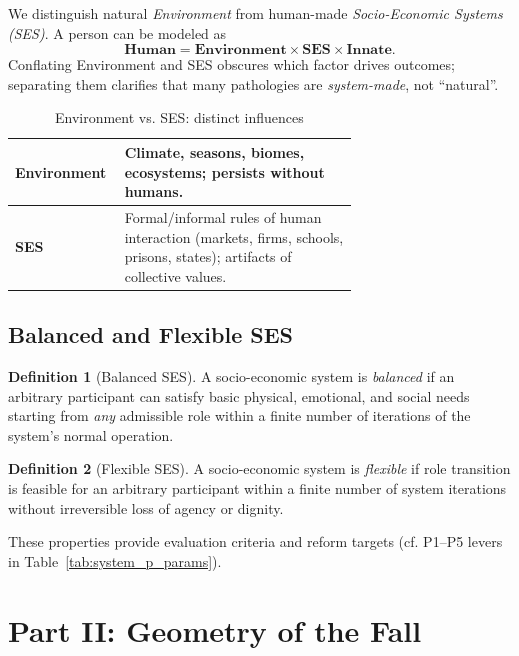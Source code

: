 \documentclass[11pt,a4paper]{article}
\theoremstyle{definition}
\newtheorem{definition}{Definition}[section]
\theoremstyle{remark}
\begin{document}
We distinguish natural \emph{Environment} from human-made \emph{Socio-Economic Systems (SES)}. A person can be modeled as
\[
\textbf{Human} = \textbf{Environment} \times \textbf{SES} \times \textbf{Innate}.
\]
Conflating Environment and SES obscures which factor drives outcomes; separating them clarifies that many pathologies are \emph{system-made}, not “natural”. %

\begin{table}[h]
\centering
\caption{Environment vs. SES: distinct influences}
\label{tab:env_ses_split}
\begin{tabular}{|l|p{0.68\linewidth}|}
\hline
\textbf{Environment} & Climate, seasons, biomes, ecosystems; persists without humans. \\
\hline
\textbf{SES} & Formal/informal rules of human interaction (markets, firms, schools, prisons, states); artifacts of collective values. \\
\hline
\end{tabular}
\end{table}

\subsection{Balanced and Flexible SES}
\label{subsec:balanced_flexible_ses}

\begin{definition}[Balanced SES]
A socio-economic system is \emph{balanced} if an arbitrary participant can satisfy basic physical, emotional, and social needs starting from \emph{any} admissible role within a finite number of iterations of the system's normal operation. %
\end{definition}

\begin{definition}[Flexible SES]
A socio-economic system is \emph{flexible} if role transition is feasible for an arbitrary participant within a finite number of system iterations without irreversible loss of agency or dignity. %
\end{definition}

\noindent These properties provide evaluation criteria and reform targets (cf. P1--P5 levers in Table~\ref{tab:system_p_params}). %


\newpage

\section{Part II: Geometry of the Fall}
\end{document}
